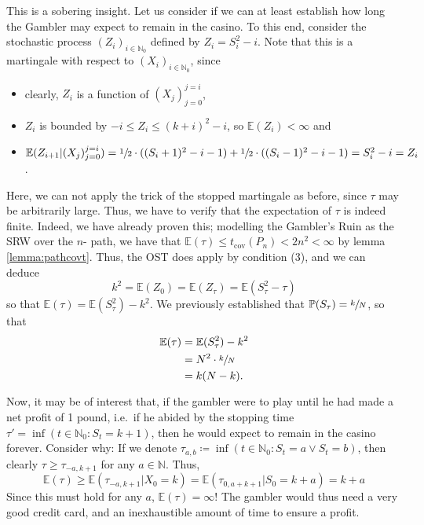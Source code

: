 	This is a sobering insight. Let us consider if we can at least establish how long the 
	Gambler may expect to remain in the casino. To this end, consider the stochastic process 
	$(Z_i)_{i\in\mathbb{N}_0}$ defined by $Z_i = S_i^2 - i$. Note that this is a martingale 
	with respect to $(X_i)_{i\in\mathbb{N}_0}$, since 
	\begin{itemize}
		\item clearly, $Z_i$ is a function of $(X_j)_{j=0}^{j=i}$,
		\item $Z_i$ is bounded by $-i\leq Z_i\leq(k+i)^2-i$, so $\mathbb{E}(Z_i)<\infty$ 
		and
		\item $\mathbb{E}(Z_{i+1} | (X_j)_{j=0}^{j=i})=\sfrac{1}{2}\cdot((S_i + 1)^2-i-1)+
		\sfrac{1}{2}\cdot((S_i-1)^2 - i-1) = S_i^2 - i = Z_i$.
	\end{itemize}
	Here, we can not apply the trick of the stopped martingale as before, since $\tau$ may be 
	arbitrarily large. Thus, we have to verify that the expectation of $\tau$ is indeed finite.
	Indeed, we have already proven this; modelling the Gambler's Ruin as the SRW over the $n$-%
	path, we have that $\mathbb{E}(\tau) \leq t_\mathrm{cov}(P_n) < 2n^2 <\infty$ by lemma 
	\ref{lemma:pathcovt}. Thus, the OST does apply by condition (3), and we can deduce
	$$
		k^2 = \mathbb{E}(Z_0) = \mathbb{E}(Z_\tau) = \mathbb{E}(S_\tau^2-\tau)
	$$
	so that $\mathbb{E}(\tau) = \mathbb{E}(S_\tau^2) - k^2$. We previously established that 
	$\mathbb{P}(S_\tau) = \sfrac{k}{N}$, so that 
	\begin{align*}
		\mathbb{E}(\tau) &= \mathbb{E}(S_\tau^2) - k^2 \\
		&= N^2 \cdot \sfrac{k}{N} \\
		&= k(N-k).
	\end{align*}

	Now, it may be of interest that, if the gambler were to play until he had made a net 
	profit of 1 pound, i.e.\ if he abided by the stopping time $\tau' = \inf(t\in\mathbb{N}_0 
	: S_t = k+1)$, then he would expect to remain in the casino forever. Consider why: If we 
	denote $\tau_{a,b} \coloneqq \inf(t\in\mathbb{N}_0: S_t = a \lor S_t = b)$, then clearly $
	\tau \geq \tau_{-a, k+1}$ for any $a \in\mathbb{N}$. Thus,
	$$
	\mathbb{E}(\tau) \geq \mathbb{E}(\tau_{-a, k+1} | X_0 = k) = 
	\mathbb{E}(\tau_{0,a+k+1}|S_0=k+a) = k+a
	$$ 
	Since this must hold for any $a$, $\mathbb{E}(\tau) = \infty$! The gambler would thus need a 
	very good credit card, and an inexhaustible amount of time to ensure a profit.


